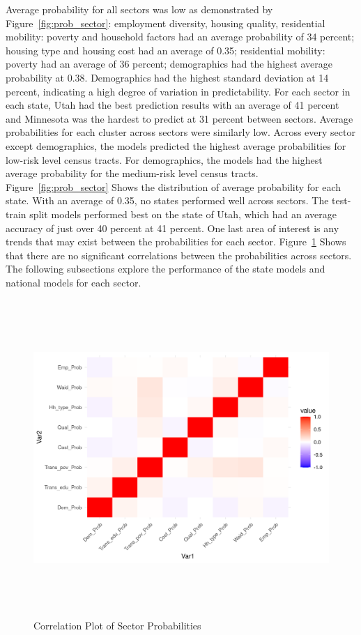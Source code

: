 Average probability for all sectors was low as demonstrated by Figure~\ref{fig:prob_sector}: employment diversity, housing quality, residential mobility: poverty and household factors had an average probability of 34 percent; housing type and housing cost had an average of 0.35; residential mobility: poverty had an average of 36 percent; demographics had the highest average probability at 0.38. Demographics had the highest standard deviation at 14 percent, indicating a high degree of variation in predictability. For each sector in each state, Utah had the best prediction results with an average of 41 percent and Minnesota was the hardest to predict at 31 percent between sectors. Average probabilities for each cluster across sectors were similarly low. Across every sector except demographics, the models predicted the highest average probabilities for low-risk level census tracts. For demographics, the models had the highest average probability for the medium-risk level census tracts. Figure~\ref{fig:prob_sector} Shows the distribution of average probability for each state. With an average of 0.35, no states performed well across sectors. The test-train split models performed best on the state of Utah, which had an average accuracy of just over 40 percent at 41 percent. One last area of interest is any trends that may exist between the probabilities for each sector. Figure~\ref{fig:prob_corr} Shows that there are no significant correlations between the probabilities across sectors. The following subsections explore the performance of the state models and national models for each sector. 

\begin{figure}[htbp]
    \centering
     \includegraphics[width=1\textwidth, height=12cm]{plots/prob_corr.png}
     \caption{Correlation Plot of Sector Probabilities}
     \label{fig:prob_corr}
 \end{figure}

